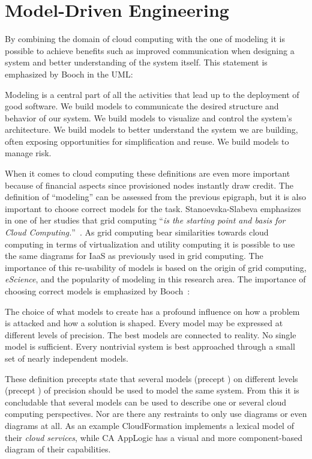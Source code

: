 \section{Model-Driven Engineering}

By combining the domain of cloud computing with the one of modeling 
it is possible to achieve benefits such as improved communication when designing 
a system and better understanding of the system itself.
This statement is emphasized by Booch \etal in the UML:
\epigraph{
  Modeling is a central
  part of all the activities that lead up to the deployment of good
  software. We build models to communicate the desired structure and
  behavior of our system. We build models to visualize and control the
  system's architecture. We build models to better understand the
  system we are building, often exposing opportunities for
  simplification and reuse. We build models to manage risk.
}{}
When it comes to cloud computing these definitions are even more important
because of financial aspects since provisioned nodes instantly draw credit.
The definition of ``modeling'' can be assessed from the previous epigraph, but it is 
also important to choose correct models for the task.
Stanoevska-Slabeva emphasizes in one of her studies that grid computing
``\emph{is the starting point and basis for Cloud Computing.}''~\cite{introduction:wozniak10}.
As grid computing bear similarities towards cloud computing in terms of virtualization 
and utility computing
it is possible to use the same  diagrams for IaaS as previously used in grid computing.
The importance of this re-usability of models is based on the origin of grid computing, 
\emph{eScience},
and the popularity of modeling in this research area.
The importance of choosing correct models is emphasized by Booch~\cite{unified:booch05}:
\epigraph{
  \begin{ii}\iitem The choice
  of what models to create has a profound influence on how a problem
  is attacked and how a solution is shaped. \iitem Every model may be
  expressed at different levels of precision. \iitem The best models
  are connected to reality. \iitem No single model is
  sufficient. Every nontrivial system is best approached through a
  small set of nearly independent models.\end{ii}
}{}
These definition precepts state that several models (precept ) on different levels (precept ) 
of precision should be used to model the same system.
From this it is concludable that several models can be used to describe one or several cloud computing perspectives.
Nor are there any restraints to only use  diagrams or even diagrams at all.
As an example  CloudFormation implements a lexical model of their \emph{cloud services},
while CA AppLogic has a visual and more  component-based diagram of their capabilities.

